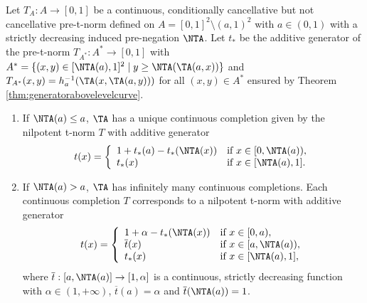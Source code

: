 \begin{theorem}\label{th:CompletionsCase(a,1)}
	Let $T_A: A \to [0,1]$ be a continuous, conditionally cancellative but not cancellative pre-t-norm defined on $A=[0,1]^2 \setminus (a,1)^2$ with $a \in (0,1)$ with a strictly decreasing induced pre-negation $\NTA$. Let $t_{*}$ be the additive generator of the pre-t-norm $T_{A^*}:A^* \to [0,1]$ with $A^* = \{(x,y) \in [\NTA(a),1]^2 \mid y \geq \NTA(\TA(a,x))\}$ and $T_{A^*}(x,y)=h_a^{-1}(\TA(x,\TA(a,y)))$ for all $(x,y) \in A^*$ ensured by Theorem \ref{thm:generatorabovelevelcurve}.
	\begin{enumerate}[label=(\roman*)]
		\item If $\NTA(a) \leq a$, $\TA$ has a unique continuous completion given by the nilpotent t-norm $T$ with additive generator
		\begin{equation}\label{eq:GeneratorCompletion(a,1)-1}
			t(x)
			=
			\left\{ \begin{array}{ll}
				1 + t_{*}(a)-t_{*}(\NTA(x)) & \text{if } x \in [0,\NTA(a)), \\
				t_{*}(x) & \text{if } x \in [\NTA(a),1].
			\end{array} \right.
		\end{equation}
		\item If $\NTA(a) > a$, $\TA$ has infinitely many continuous completions. Each continuous completion $T$ corresponds to a nilpotent t-norm with additive generator
		\begin{equation}\label{eq:GeneratorCompletion(a,1)-2}
			t(x)
			=
			\left\{ \begin{array}{ll}
				1+\alpha-t_{*}(\NTA(x)) & \text{if } x \in [0,a), \\
				\overline{t}(x) & \text{if } x \in [a,\NTA(a)), \\
				t_{*}(x) & \text{if } x \in [\NTA(a),1],
			\end{array} \right.
		\end{equation}
		where $\overline{t}:[a,\NTA(a)] \to [1,\alpha]$ is a continuous, strictly decreasing function  with $\alpha \in (1,+\infty)$, $\overline{t}(a)=\alpha$ and $\overline{t}(\NTA(a))=1$.
	\end{enumerate}
\end{theorem}

